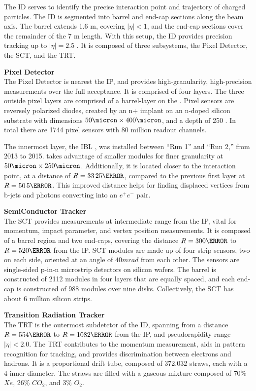 The \gls{ID} serves to identify the precise interaction point and trajectory of charged particles. The \gls{ID} is segmented into barrel and end-cap sections along the beam axis. The barrel extends 1.6 m, covering $|\eta| < 1$, and the end-cap sections cover the remainder of the 7 m length. With this setup, the \gls{ID} provides precision tracking up to $|\eta| = 2.5$ \cite{inner-detector-tdr}. It is composed of three subsystems, the Pixel Detector, the \gls{SCT}, and the \gls{TRT}.

\noindent\textbf{Pixel Detector}\\
\indent The Pixel Detector is nearest the \gls{IP}, and provides high-granularity, high-precision measurements over the full acceptance. It is comprised of four layers. The three outside pixel layers are comprised of a barrel-layer on the . Pixel sensors are reversely polarized diodes, created by an n+ implant on an n-doped silicon substrate with dimensions $50 \micron \times 400 \micron$, and a depth of 250 \micron. In total there are 1744 pixel sensors with 80 million readout channels.
    
The innermost layer, the \gls{IBL} \cite{ibl-tdr}, was installed between ``Run 1'' and ``Run 2,'' from 2013 to 2015. takes advantage of smaller modules for finer granularity at $\unit{50}{\micron} \times \unit{250}{\micron}$. Additionally, it is located closer to the interaction point, at a distance of $R=\unit{33.25}{\mm}$, compared to the previous first layer at $R=\unit{50.5}{\mm}$. This improved distance helps for finding displaced vertices from b-jets and photons converting into an $e^+e^-$ pair.

\noindent\textbf{SemiConductor Tracker}\\
\indent The \gls{SCT} provides measurements at intermediate range from the \gls{IP}, vital for momentum, impact parameter, and vertex position measurements. It is composed of a barrel region and two end-caps, covering the distance $R=\unit{300}{\mm}$ to $R= \unit{520}{\mm}$ from the \gls{IP}. \gls{SCT} modules are made up of four strip sensors, two on each side, oriented at an angle of $\unit{40}{mrad}$ from each other. The sensors are single-sided p-in-n microstrip detectors on silicon wafers. The barrel is constructed of 2112 modules in four layers that are equally spaced, and each end-cap is constructed of 988 modules over nine disks. Collectively, the \gls{SCT} has about 6 million silicon strips.

\noindent\textbf{Transition Radiation Tracker}\\
\indent The \gls{TRT} is the outermost subdetctor of the \gls{ID}, spanning from a distance $R=\unit{554}{\mm}$ to $R= \unit{1082}{\mm}$ from the \gls{IP}, and pseudorapidity range $|\eta| < 2.0$. The \gls{TRT} contributes to the momentum measurement, aids in pattern recognition for tracking, and provides discrimination between electrons and hadrons. It is a proportional drift tube, composed of 372,032 straws, each with a 4 \text{\mm} inner diameter. The straws are filled with a gaseous mixture composed of 70\% $Xe$, 26\% $CO_2$, and 3\% $O_2$.
    

